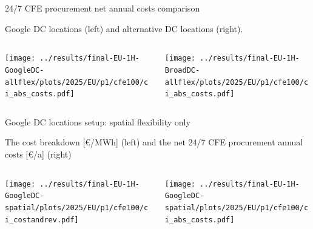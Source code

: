 \begin{frame}{24/7 CFE procurement net annual costs comparison}

  \centering
  {\footnotesize
  Google DC locations (left) and alternative DC locations (right).
  }
  \vspace{.5cm}
  
  \begin{columns}
  \begin{column}{7cm}
  \centering
  \texttt{[image: ../results/final-EU-1H-GoogleDC-allflex/plots/2025/EU/p1/cfe100/ci\_abs\_costs.pdf]}
  \end{column}
  
  \begin{column}{8cm}
    \centering
    \texttt{[image: ../results/final-EU-1H-BroadDC-allflex/plots/2025/EU/p1/cfe100/ci\_abs\_costs.pdf]}
    \end{column}
  \end{columns}
  
  
\end{frame}


\begin{frame}{Google DC locations setup: spatial flexibility only}
  
  \centering

  {\footnotesize
  The cost breakdown [\euro/MWh] (left) and the net 24/7 CFE procurement annual costs [\euro/a] (right)
  }
  \vspace{.5cm}

  \begin{columns}
    \begin{column}{8cm}
    \centering
    \texttt{[image: ../results/final-EU-1H-GoogleDC-spatial/plots/2025/EU/p1/cfe100/ci\_costandrev.pdf]}
    \end{column}
    
    \begin{column}{8cm}
      \centering
      \texttt{[image: ../results/final-EU-1H-GoogleDC-spatial/plots/2025/EU/p1/cfe100/ci\_abs\_costs.pdf]}
      \end{column}
    \end{columns}

\end{frame}


